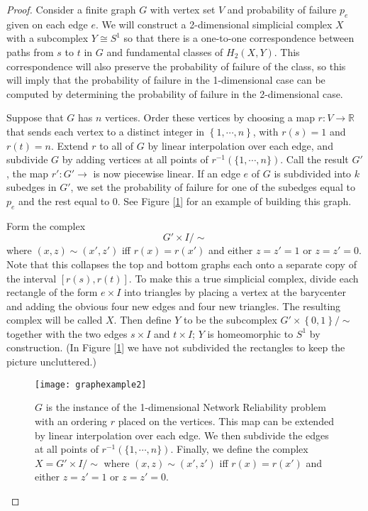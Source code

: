 \documentclass[10pt,twocolumn]{article} \usepackage{amsmath,epsf,amssymb,cite,pifont,amsthm, mathrsfs,epsfig,  bbm, amsthm,  setspace}
\newcommand{\R}{\mathbb R}
\newcommand{\iso}{\cong}
\newcommand{\inv}{^{-1}}
\renewcommand{\1}{\mathbbm{1}}
\begin{document}
\begin{proof}
Consider a finite graph $G$ with vertex set $V$ and  probability of failure
$p_e$ given on each edge $e$.
We will construct a 2-dimensional simplicial complex $X$ with a subcomplex $Y \iso S^1$
 so that there is a one-to-one correspondence between paths from $s$ to $t$ in $G$
  and fundamental classes of $H_2(X,Y)$.
This correspondence will also preserve the probability of failure of the class,
so this will imply that the probability of failure in the 1-dimensional case can be computed by
determining the probability of failure in the 2-dimensional case.

Suppose that $G$ has $n$ vertices.
Order these vertices by choosing a map
$r:V \to \R$ that sends each vertex to a distinct integer in
$\left\{ 1,\cdots,n \right\}$, with $r(s)=1$ and $r(t)=n$.
Extend $r$ to all of $G$ by linear interpolation over each edge,
and subdivide $G$ by adding vertices at all points of $r^{-1}( \{ 1,\cdots,n \} )$.
Call the result $G'$, the map $r': G' \to $ is now piecewise linear.
If an edge $e$ of $G$ is subdivided into $k$ subedges in $G'$,
we set the probability of failure for one of the subedges equal to $p_e$ and the rest equal to 0.  
See Figure [\ref{fig:graphexample}] for an example of building this graph.

Form the complex
\begin{equation*}
G'\times I / \sim
\end{equation*}
where $(x,z) \sim (x',z')$ iff $r(x)=r(x')$ and either $z=z'=1$ or $z=z'=0$.
Note that this collapses the top and  bottom graphs each onto a separate copy of the interval
$[r(s), r(t)]$.
To make this a true simplicial complex, divide each rectangle of the form $e \times I$
into triangles by placing a vertex at the barycenter and adding the obvious four new edges
and four new triangles.
The resulting complex will be called $X$.
Then define $Y$ to be the subcomplex
$G'\times \left\{ 0,1 \right\}/\sim$ together with the two edges $s \times I$ and $t \times I$;
$Y$ is homeomorphic to $S^1$ by construction.
(In Figure [\ref{fig:graphexample}] we
have not subdivided the rectangles to keep the picture uncluttered.)


\begin{figure}[h]
\begin{center}
\texttt{[image: graphexample2]}
\end{center}
\caption{$G$ is the instance of the 1-dimensional Network Reliability problem with an ordering $r$ placed on the vertices.
This map can be extended by linear interpolation over each edge.
We then subdivide the edges at all points of $r \inv (\{1,\cdots,n\})$.
Finally, we define the complex $X = G'\times I / \sim$ where $(x,z) \sim (x',z')$ iff $r(x)=r(x')$
and either $z=z'=1$ or $z=z'=0$.  }
\label{fig:graphexample}
\end{figure}


\end{proof}
\end{document}
